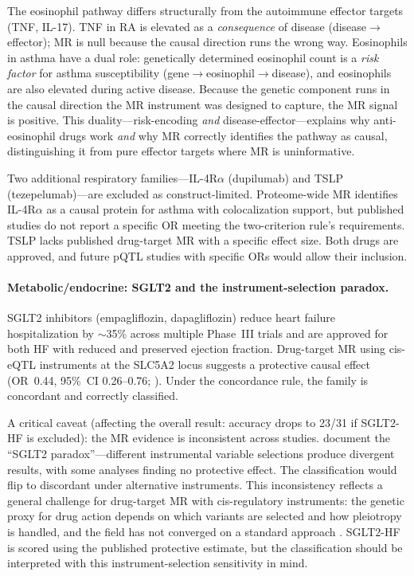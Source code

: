 \documentclass[11pt]{article}
\begin{document}
The eosinophil pathway differs structurally from the autoimmune effector targets (TNF, IL-17). TNF in RA is elevated as a \emph{consequence} of disease (disease$\to$effector); MR is null because the causal direction runs the wrong way. Eosinophils in asthma have a dual role: genetically determined eosinophil count is a \emph{risk factor} for asthma susceptibility (gene$\to$eosinophil$\to$disease), and eosinophils are also elevated during active disease. Because the genetic component runs in the causal direction the MR instrument was designed to capture, the MR signal is positive. This duality---risk-encoding \emph{and} disease-effector---explains why anti-eosinophil drugs work \emph{and} why MR correctly identifies the pathway as causal, distinguishing it from pure effector targets where MR is uninformative.

Two additional respiratory families---IL-4R$\alpha$ (dupilumab) and TSLP (tezepelumab)---are excluded as construct-limited. Proteome-wide MR identifies IL-4R$\alpha$ as a causal protein for asthma with colocalization support, but published studies do not report a specific OR meeting the two-criterion rule's requirements. TSLP lacks published drug-target MR with a specific effect size. Both drugs are approved, and future pQTL studies with specific ORs would allow their inclusion.

\paragraph{Metabolic/endocrine: SGLT2 and the instrument-selection paradox.}
SGLT2 inhibitors (empagliflozin, dapagliflozin) reduce heart failure hospitalization by $\sim$35\% across multiple Phase~III trials and are approved for both HF with reduced and preserved ejection fraction. Drug-target MR using cis-eQTL instruments at the SLC5A2 locus suggests a protective causal effect (OR~0.44, 95\%~CI 0.26--0.76; \cite{zheng2020sglt2mr}). Under the concordance rule, the family is concordant and correctly classified.

A critical caveat (affecting the overall result: accuracy drops to 23/31 if SGLT2-HF is excluded): the MR evidence is inconsistent across studies. \citet{sglt2paradox2025} document the ``SGLT2 paradox''---different instrumental variable selections produce divergent results, with some analyses finding no protective effect. The classification would flip to discordant under alternative instruments. This inconsistency reflects a general challenge for drug-target MR with cis-regulatory instruments: the genetic proxy for drug action depends on which variants are selected and how pleiotropy is handled, and the field has not converged on a standard approach \cite{gill2024pitfalls}. SGLT2-HF is scored using the published protective estimate, but the classification should be interpreted with this instrument-selection sensitivity in mind.
\end{document}
